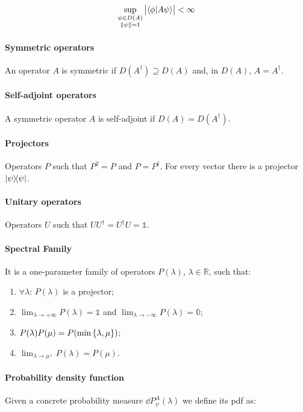 \documentclass[main.tex]{subfiles}
\begin{document}
\begin{equation}
    \sup_{\substack{\psi \in D(A) \\ \norm{\psi} = 1}}
    \abs{\braket{\phi}{A \psi}} < \infty
\end{equation}

\paragraph{Symmetric operators} An operator $A$ is symmetric if $D(A^\dag) \supseteq D(A)$ and, in $D(A)$, $A=A^\dag$.

\paragraph{Self-adjoint operators} A symmetric operator $A$ is self-adjoint if $D(A) = D(A^\dag)$.

\paragraph{Projectors} Operators $P$ such that $P^2 = P$ and $P = P^\dag$. For every vector there is a projector $\ketbra{\psi}{\psi}$.

\paragraph{Unitary operators} Operators $U$ such that $UU^\dag = U^\dag U = \mathbb{1}$.

\paragraph{Spectral Family} It is a one-parameter family of operators $P(\lambda)$, $\lambda \in \mathbb{R}$, such that:

\begin{enumerate}
    \item $\forall \lambda$: $P(\lambda)$ is a projector;
    \item $\lim_{\lambda \rightarrow +\infty} P(\lambda) = \mathbb{1}$ and $\lim_{\lambda \rightarrow -\infty} P(\lambda) = \mathbb{0}$;
    \item $P(\lambda) P(\mu) = P(\min\qty{\lambda, \mu})$;
    \item $\lim _{\lambda \rightarrow \mu ^+} P(\lambda) = P(\mu)$.
\end{enumerate}

\paragraph{Probability density function} Given a concrete probability measure $\dd{P^A_\psi (\lambda)}$ we define its pdf as:
\end{document}
